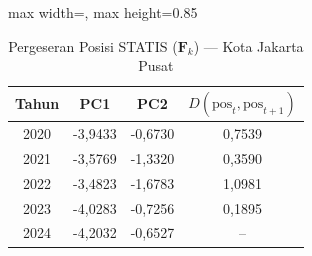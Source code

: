 \begin{table}[H]
\centering
\caption{Pergeseran Posisi STATIS ($\mathbf{F}_k$) --- Kota Jakarta Pusat} \label{tab:app2jarak_statis_skor_kota_jakarta_pusat}
\begin{adjustbox}{max width=\textwidth, max height=0.85\textheight}
\begin{tabular}{|c|c|c|c|}
\hline
\textbf{Tahun} & \textbf{PC1} & \textbf{PC2} & \textbf{$D(\text{pos}_t, \text{pos}_{t+1})$} \\
\hline
2020 & -3,9433 & -0,6730 & 0,7539 \\
2021 & -3,5769 & -1,3320 & 0,3590 \\
2022 & -3,4823 & -1,6783 & 1,0981 \\
2023 & -4,0283 & -0,7256 & 0,1895 \\
2024 & -4,2032 & -0,6527 & -- \\
\hline
\end{tabular}
\end{adjustbox}
\end{table}
